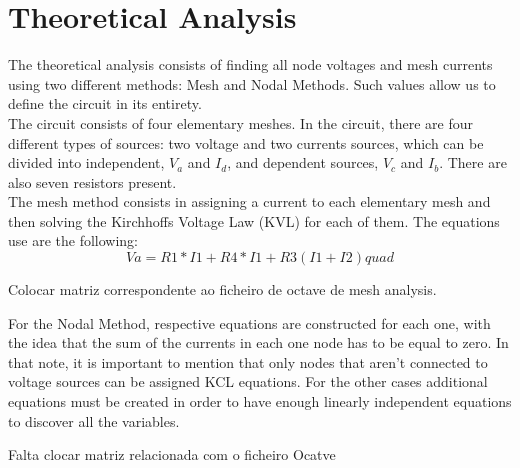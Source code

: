 \section{Theoretical Analysis}
\label{sec:analysis}

The theoretical analysis consists of finding all node voltages and mesh currents using two different methods: Mesh and Nodal Methods. Such values allow us to define the circuit in its entirety.\\

The circuit consists of four elementary meshes. In the circuit, there are four different types of sources: two voltage and two currents sources, which can be divided into independent, $V_a$ and $I_d$, and dependent sources, $V_c$ and $I_b$. There are also seven resistors present.\\

\vspace {1cm}
The mesh method consists in assigning a current to each elementary mesh and then solving the Kirchhoffs Voltage Law (KVL) for each of them. The equations use are the following: \[ Va=R1*I1+R4*I1+R3(I1+I2) quad \]

\vspace {1cm}
Colocar matriz correspondente ao ficheiro de octave de mesh analysis. 
\vspace{1cm}



For the Nodal Method, respective equations are constructed for each one, with the idea that the sum of the currents in each one node has to be equal to zero. In that note, it is important to mention that only nodes that aren't connected to voltage sources can be assigned KCL equations. For the other cases additional equations must be created in order to have enough linearly independent equations to discover all the variables. 

\vspace{1cm}

Falta clocar matriz relacionada com o ficheiro Ocatve 

\vspace {1cm}

